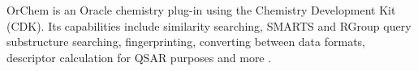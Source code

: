 OrChem is an Oracle chemistry plug-in using the Chemistry Development Kit (CDK). Its capabilities include similarity searching, SMARTS and RGroup query substructure searching, fingerprinting, converting between data formats, descriptor calculation for QSAR purposes and more \cite{Rijnbeek_2009}.